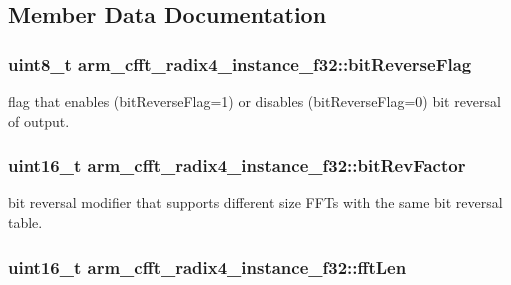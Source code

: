 \subsection{Member Data Documentation}
\hypertarget{structarm__cfft__radix4__instance__f32_ac10927a1620195a88649ce63dab66120}{
\subsubsection[{bit\-Reverse\-Flag}]{\setlength{\rightskip}{0pt plus 5cm}uint8\-\_\-t arm\-\_\-cfft\-\_\-radix4\-\_\-instance\-\_\-f32\-::bit\-Reverse\-Flag}}\label{structarm__cfft__radix4__instance__f32_ac10927a1620195a88649ce63dab66120}
flag that enables (bit\-Reverse\-Flag=1) or disables (bit\-Reverse\-Flag=0) bit reversal of output. \hypertarget{structarm__cfft__radix4__instance__f32_acc8cb18a8b901b8321ab9d86491e41a3}{
\subsubsection[{bit\-Rev\-Factor}]{\setlength{\rightskip}{0pt plus 5cm}uint16\-\_\-t arm\-\_\-cfft\-\_\-radix4\-\_\-instance\-\_\-f32\-::bit\-Rev\-Factor}}\label{structarm__cfft__radix4__instance__f32_acc8cb18a8b901b8321ab9d86491e41a3}
bit reversal modifier that supports different size F\-F\-Ts with the same bit reversal table. \hypertarget{structarm__cfft__radix4__instance__f32_a7e6a6d290ce158ce9a15a45e364b021a}{
\subsubsection[{fft\-Len}]{\setlength{\rightskip}{0pt plus 5cm}uint16\-\_\-t arm\-\_\-cfft\-\_\-radix4\-\_\-instance\-\_\-f32\-::fft\-Len}}\label{structarm__cfft__radix4__instance__f32_a7e6a6d290ce158ce9a15a45e364b021a}
